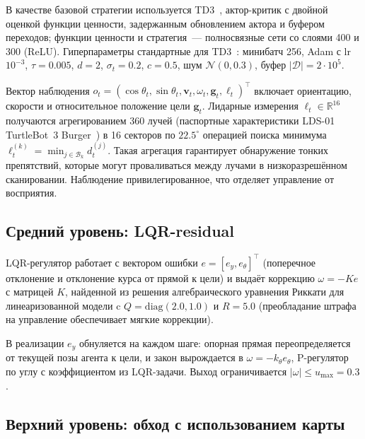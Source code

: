 \documentclass[11pt]{article}
\begin{document}
В качестве базовой стратегии используется TD3~\cite{fujimoto2018td3}, актор-критик с двойной оценкой функции ценности, задержанным обновлением актора и буфером переходов; функции ценности и стратегия~--- полносвязные сети со слоями 400 и 300 (ReLU). Гиперпараметры стандартные для TD3~\cite{raffin2021sb3}: минибатч 256, Adam с lr $10^{-3}$, $\tau = 0.005$, $d = 2$, $\sigma_t = 0.2$, $c = 0.5$, шум $\mathcal{N}(0, 0.3)$, буфер $|\mathcal{D}| = 2 \cdot 10^5$.

Вектор наблюдения $o_t = (\cos\theta_t, \sin\theta_t, \mathbf{v}_t, \omega_t, \mathbf{g}_t, \ell_t)^\top$ включает ориентацию, скорости и относительное положение цели $\mathbf{g}_t$. Лидарные измерения $\ell_t \in \mathbb{R}^{16}$ получаются агрегированием 360 лучей (паспортные характеристики LDS-01 TurtleBot~3 Burger~\cite{lds01_datasheet}) в 16 секторов по $22.5^\circ$ операцией поиска минимума $\ell_t^{(k)} = \min_{j \in \mathcal{B}_k} d_t^{(j)}$. Такая агрегация гарантирует обнаружение тонких препятствий, которые могут проваливаться между лучами в низкоразрешённом сканировании. Наблюдение привилегированное, что отделяет управление от восприятия.


\subsection{Средний уровень: LQR-residual}
\label{sec:tactical}

LQR-регулятор работает с вектором ошибки $e = [e_y, e_\theta]^\top$ (поперечное отклонение и отклонение курса от прямой к цели) и выдаёт коррекцию $\omega = -K e$ с матрицей $K$, найденной из решения алгебраического уравнения Риккати для линеаризованной модели c $Q = \mathrm{diag}(2.0, 1.0)$ и $R = 5.0$ (преобладание штрафа на управление обеспечивает мягкие коррекции).

В реализации $e_y$ обнуляется на каждом шаге: опорная прямая переопределяется от текущей позы агента к цели, и закон вырождается в $\omega = -k_\theta e_\theta$, P-регулятор по углу с коэффициентом из LQR-задачи. Выход ограничивается $|\omega| \leq u_{\max} = 0.3$.


\subsection{Верхний уровень: обход с использованием карты}
\label{sec:supervisory}
\end{document}

